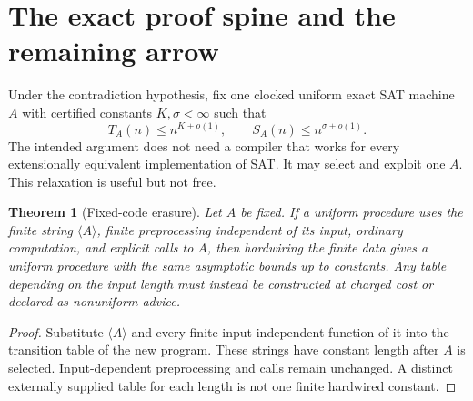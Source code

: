 \documentclass[11pt]{article}
\newtheorem{theorem}{Theorem}[section]
\begin{document}
\section{The exact proof spine and the remaining arrow}

Under the contradiction hypothesis, fix one clocked uniform exact SAT
machine $A$ with certified constants $K,\sigma<\infty$ such that
\begin{equation}
 T_A(n)\le n^{K+o(1)},\qquad S_A(n)\le n^{\sigma+o(1)}.
 \label{eq:A-bounds}
\end{equation}
The intended argument does not need a compiler that works for every
extensionally equivalent implementation of SAT.  It may select and exploit
one $A$.  This relaxation is useful but not free.

\begin{theorem}[Fixed-code erasure]
Let $A$ be fixed.  If a uniform procedure uses the finite string
$\langle A\rangle$, finite preprocessing independent of its input, ordinary
computation, and explicit calls to $A$, then hardwiring the finite data gives
a uniform procedure with the same asymptotic bounds up to constants.  Any
table depending on the input length must instead be constructed at charged
cost or declared as nonuniform advice.
\end{theorem}

\begin{proof}
Substitute $\langle A\rangle$ and every finite input-independent function of
it into the transition table of the new program.  These strings have constant
length after $A$ is selected.  Input-dependent preprocessing and calls remain
unchanged.  A distinct externally supplied table for each length is not one
finite hardwired constant.
\end{proof}
\end{document}
